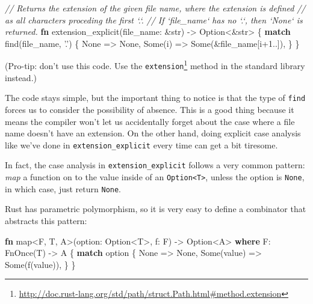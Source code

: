 \documentclass[a4paper,]{book}
\newenvironment{Shaded}{\begin{snugshade}}{\end{snugshade}}
\newcommand{\KeywordTok}[1]{\textcolor[rgb]{0.13,0.29,0.53}{\textbf{{#1}}}}
\newcommand{\DataTypeTok}[1]{\textcolor[rgb]{0.13,0.29,0.53}{{#1}}}
\newcommand{\DecValTok}[1]{\textcolor[rgb]{0.00,0.00,0.81}{{#1}}}
\newcommand{\ConstantTok}[1]{\textcolor[rgb]{0.00,0.00,0.00}{{#1}}}
\newcommand{\CharTok}[1]{\textcolor[rgb]{0.31,0.60,0.02}{{#1}}}
\newcommand{\CommentTok}[1]{\textcolor[rgb]{0.56,0.35,0.01}{\textit{{#1}}}}
\newcommand{\BuiltInTok}[1]{{#1}}
\newcommand{\NormalTok}[1]{{#1}}
\renewcommand{\href}[2]{#2\footnote{\url{#1}}}
\begin{document}
\begin{Shaded}
\begin{Highlighting}[]
\CommentTok{// Returns the extension of the given file name, where the extension is defined}
\CommentTok{// as all characters proceding the first `.`.}
\CommentTok{// If `file_name` has no `.`, then `None` is returned.}
\KeywordTok{fn} \NormalTok{extension_explicit(file_name: &}\DataTypeTok{str}\NormalTok{) -> }\DataTypeTok{Option}\NormalTok{<&}\DataTypeTok{str}\NormalTok{> \{}
    \KeywordTok{match} \NormalTok{find(file_name, }\CharTok{'.'}\NormalTok{) \{}
        \ConstantTok{None} \NormalTok{=> }\ConstantTok{None}\NormalTok{,}
        \ConstantTok{Some}\NormalTok{(i) => }\ConstantTok{Some}\NormalTok{(&file_name[i+}\DecValTok{1.}\NormalTok{.]),}
    \NormalTok{\}}
\NormalTok{\}}
\end{Highlighting}
\end{Shaded}

(Pro-tip: don't use this code. Use the
\href{http://doc.rust-lang.org/std/path/struct.Path.html\#method.extension}{\texttt{extension}}
method in the standard library instead.)

The code stays simple, but the important thing to notice is that the
type of \texttt{find} forces us to consider the possibility of absence.
This is a good thing because it means the compiler won't let us
accidentally forget about the case where a file name doesn't have an
extension. On the other hand, doing explicit case analysis like we've
done in \texttt{extension\_explicit} every time can get a bit tiresome.

In fact, the case analysis in \texttt{extension\_explicit} follows a
very common pattern: \emph{map} a function on to the value inside of an
\texttt{Option\textless{}T\textgreater{}}, unless the option is
\texttt{None}, in which case, just return \texttt{None}.

Rust has parametric polymorphism, so it is very easy to define a
combinator that abstracts this pattern:

\begin{Shaded}
\begin{Highlighting}[]
\KeywordTok{fn} \NormalTok{map<F, T, A>(option: }\DataTypeTok{Option}\NormalTok{<T>, f: F) -> }\DataTypeTok{Option}\NormalTok{<A> }\KeywordTok{where} \NormalTok{F: }\BuiltInTok{FnOnce}\NormalTok{(T) -> A \{}
    \KeywordTok{match} \NormalTok{option \{}
        \ConstantTok{None} \NormalTok{=> }\ConstantTok{None}\NormalTok{,}
        \ConstantTok{Some}\NormalTok{(value) => }\ConstantTok{Some}\NormalTok{(f(value)),}
    \NormalTok{\}}
\NormalTok{\}}
\end{Highlighting}
\end{Shaded}
\end{document}
